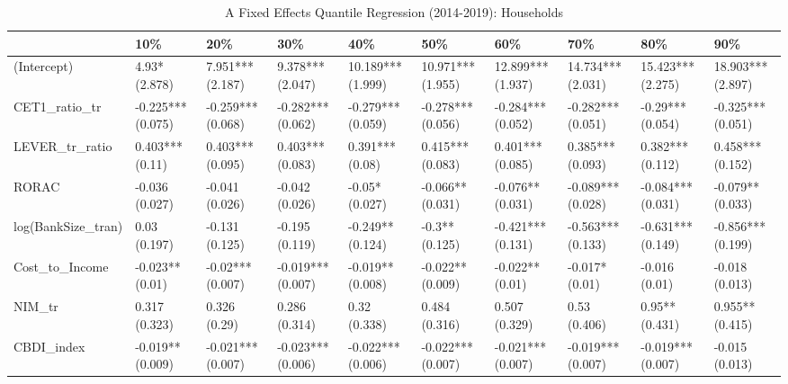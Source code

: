 \begin{table}[ht]
\centering
\caption{A Fixed Effects Quantile Regression (2014-2019): Households} 
\begingroup\small
\begin{tabular}{llllllllll}
  \toprule
 & 10\% & 20\% & 30\% & 40\% & 50\% & 60\% & 70\% & 80\% & 90\% \\ 
  \midrule
(Intercept) & 4.93* (2.878) & 7.951*** (2.187) & 9.378*** (2.047) & 10.189*** (1.999) & 10.971*** (1.955) & 12.899*** (1.937) & 14.734*** (2.031) & 15.423*** (2.275) & 18.903*** (2.897) \\ 
  CET1\_ratio\_tr & -0.225*** (0.075) & -0.259*** (0.068) & -0.282*** (0.062) & -0.279*** (0.059) & -0.278*** (0.056) & -0.284*** (0.052) & -0.282*** (0.051) & -0.29*** (0.054) & -0.325*** (0.051) \\ 
  LEVER\_tr\_ratio & 0.403*** (0.11) & 0.403*** (0.095) & 0.403*** (0.083) & 0.391*** (0.08) & 0.415*** (0.083) & 0.401*** (0.085) & 0.385*** (0.093) & 0.382*** (0.112) & 0.458*** (0.152) \\ 
  RORAC & -0.036 (0.027) & -0.041 (0.026) & -0.042 (0.026) & -0.05* (0.027) & -0.066** (0.031) & -0.076** (0.031) & -0.089*** (0.028) & -0.084*** (0.031) & -0.079** (0.033) \\ 
  log(BankSize\_tran) & 0.03 (0.197) & -0.131 (0.125) & -0.195 (0.119) & -0.249** (0.124) & -0.3** (0.125) & -0.421*** (0.131) & -0.563*** (0.133) & -0.631*** (0.149) & -0.856*** (0.199) \\ 
  Cost\_to\_Income & -0.023** (0.01) & -0.02*** (0.007) & -0.019*** (0.007) & -0.019** (0.008) & -0.022** (0.009) & -0.022** (0.01) & -0.017* (0.01) & -0.016 (0.01) & -0.018 (0.013) \\ 
  NIM\_tr & 0.317 (0.323) & 0.326 (0.29) & 0.286 (0.314) & 0.32 (0.338) & 0.484 (0.316) & 0.507 (0.329) & 0.53 (0.406) & 0.95** (0.431) & 0.955** (0.415) \\ 
  CBDI\_index & -0.019** (0.009) & -0.021*** (0.007) & -0.023*** (0.006) & -0.022*** (0.006) & -0.022*** (0.007) & -0.021*** (0.007) & -0.019*** (0.007) & -0.019*** (0.007) & -0.015 (0.013) \\ 
   \bottomrule
\end{tabular}
\endgroup
\end{table}
